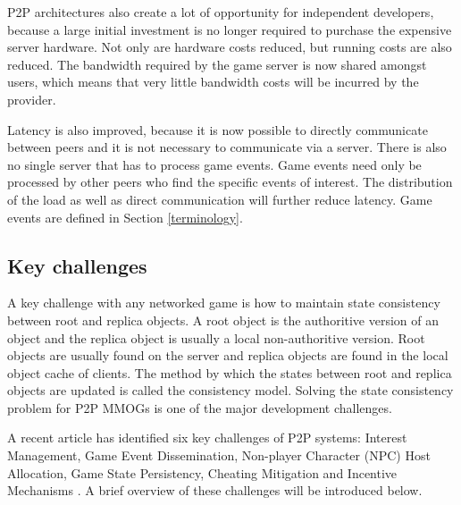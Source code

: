 \documentclass[10pt,a4paper,journal,cspaper,compsoc]{IEEEtran}
\begin{document}
P2P architectures also create a lot of opportunity for independent developers, because a large initial investment is no longer required to purchase
the expensive server hardware. Not only are hardware costs reduced, but running costs are also reduced. The bandwidth required by the game server is
now shared amongst users, which means that very little bandwidth costs will be incurred by the provider.

Latency is also improved, because it is now possible to directly communicate between peers and it is not necessary to communicate via a server. There
is also no single server that has to process game events. Game events need only be processed by other peers who find the specific events of interest.
The distribution of the load as well as direct communication will further reduce latency. Game events are defined in Section \ref{terminology}.

\subsection{Key challenges}
\label{key_challenges}

A key challenge with any networked game is how to maintain state consistency between root and replica objects. A root object is the authoritive
version of an object and the replica object is usually a local non-authoritive version. Root objects are usually found on the server and replica
objects are found in the local object cache of clients. The method by which the states between root and replica objects are updated is called the
consistency model. Solving the state consistency problem for P2P MMOGs is one of the major development challenges.

A recent article has identified six key challenges of P2P systems: Interest Management, Game Event Dissemination, Non-player Character (NPC) Host
Allocation, Game State Persistency, Cheating Mitigation and Incentive Mechanisms \cite{Fan_deisgn_issues_p2p}. A brief overview of these challenges
will be introduced below.
\end{document}
